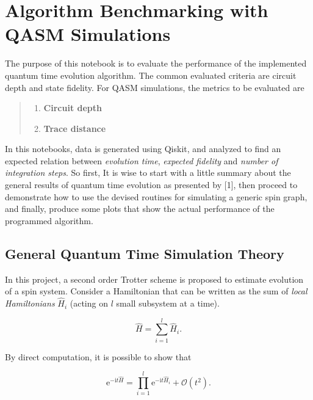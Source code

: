 \hypertarget{algorithm-benchmarking-with-qasm-simulations}{%
\section{Algorithm Benchmarking with QASM
Simulations}\label{algorithm-benchmarking-with-qasm-simulations}}

The purpose of this notebook is to evaluate the performance of the
implemented quantum time evolution algorithm. The common evaluated
criteria are circuit depth and state fidelity. For QASM simulations, the
metrics to be evaluated are

\begin{quote}
\begin{enumerate}
\def\labelenumi{\arabic{enumi}.}
\tightlist
\item
  \textbf{Circuit depth}
\item
  \textbf{Trace distance}
\end{enumerate}
\end{quote}

In this notebooks, data is generated using Qiskit, and analyzed to find
an expected relation between \emph{evolution time}, \emph{expected
fidelity} and \emph{number of integration steps}. So first, It is wise
to start with a little summary about the general results of quantum time
evolution as presented by {[}1{]}, then proceed to demonstrate how to
use the devised routines for simulating a generic spin graph, and
finally, produce some plots that show the actual performance of the
programmed algorithm.

    \hypertarget{general-quantum-time-simulation-theory}{%
\subsection{General Quantum Time Simulation
Theory}\label{general-quantum-time-simulation-theory}}

In this project, a second order Trotter scheme is proposed to estimate
evolution of a spin system. Consider a Hamiltonian that can be written
as the sum of \emph{local Hamiltonians} $\hat{H}_i$ (acting on $l$ small subsystem at
a time).

\[
\hat{H} = \sum_{i=1}^{l} \hat{H}_i.
\]

By direct computation, it is possible to show that

\[
\mathrm{e}^{-\mathrm{i}t\hat{H}} = \prod_{i=1}^{l} \mathrm{e}^{-\mathrm{i}t\hat{H}_i} + \mathcal{O}(t^2).
\]

